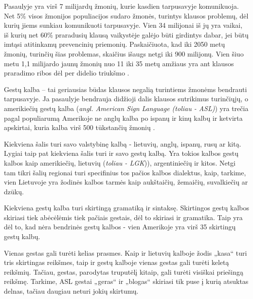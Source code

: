 \documentclass{VUMIFPSbakalaurinis}
\begin{document}

\tableofcontents

Pasaulyje yra virš 7 milijardų žmonių, kurie kasdien tarpusavyje komunikuoja. Net 5\% visos žmonijos populiacijos sudaro žmonės, turintys klausos problemų, dėl kurių jiems sunkiau komunikuoti tarpusavyje. Vien 34 milijonai iš jų yra vaikai, iš kurių net 60\% praradusių klausą vaikystėje galėjo būti girdintys dabar, jei būtų imtąsi atitinkamų prevencinių priemonių. Paskaičiuota, kad iki 2050 metų žmonių, turinčių šias problemas, skaičius išaugs netgi iki 900 milijonų. Vien šiuo metu 1,1 milijardo jaunų žmonių nuo 11 iki 35 metų amžiaus yra ant klausos praradimo ribos dėl per didelio triukšmo \cite{WhoInt}.

Gestų kalba – tai geriausias būdas klausos negalią turintiems žmonėms bendrauti tarpusavyje. Ja pasaulyje bendrauja didžioji dalis klausos sutrikimus turinčiųjų, o amerikiečių gestų kalba (\textit{angl. American Sign Language (toliau - ASL)}) yra trečia pagal populiarumą Amerikoje ne anglų kalba po ispanų ir kinų kalbų ir ketvirta apskirtai, kuria kalba virš 500 tūkstančių žmonių \cite{Gall}. 

Kiekviena šalis turi savo valstybinę kalbą - lietuvių, anglų, ispanų, rusų ar kitą. Lygiai taip pat kiekviena šalis turi ir savo gestų kalbą. Yra tokios kalbos gestų kalbos kaip amerikiečių, lietuvių (\textit{toliau - LGK})), argentiniečių ir kitos. Netgi tam tikri šalių regionai turi specifinius tos pačios kalbos dialektus, kaip, tarkime, vien Lietuvoje yra žodinės kalbos tarmės kaip aukštaičių, žemaičių, suvalkiečių ar dzūkų.

Kiekviena gestų kalba turi skirtingą gramatiką ir sintaksę. Skirtingos gestų kalbos skiriasi tiek abėcėlėmis tiek pačiais gestais, dėl to skiriasi ir gramatika. Taip yra dėl to, kad nėra bendrinės gestų kalbos - vien Amerikoje yra virš 35 skirtingų gestų kalbų.

Vienas gestas gali turėti kelias prasmes. Kaip ir lietuvių kalboje žodis „kasa“ turi tris skirtingas reikšmes, taip ir gestų kalboje vienas gestas gali turėti keletą reikšmių. Tačiau, gestas, parodytas truputėlį kitaip, gali turėti visiškai priešingą reikšmę. Tarkime, ASL gestai „geras“ ir „blogas“ skiriasi tik puse į kurią atsuktas delnas, tačiau daugiau neturi jokių skirtumų.
\end{document}
